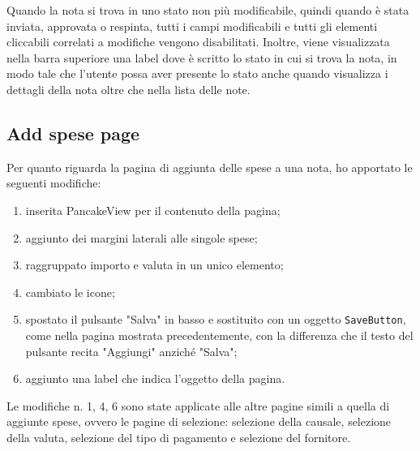 \noindent Quando la nota si trova in uno stato non più modificabile, quindi quando è stata inviata, approvata o respinta, tutti i campi modificabili e tutti gli elementi cliccabili correlati a modifiche vengono disabilitati. Inoltre, viene visualizzata nella barra superiore una label dove è scritto lo stato in cui si trova la nota, in modo tale che l'utente possa aver presente lo stato anche quando visualizza i dettagli della nota oltre che nella lista delle note.

\clearpage

\subsection{Add spese page}

Per quanto riguarda la pagina di aggiunta delle spese a una nota, ho apportato le seguenti modifiche:
\begin{enumerate}
    \item inserita PancakeView per il contenuto della pagina;
    \item aggiunto dei margini laterali alle singole spese;
    \item raggruppato importo e valuta in un unico elemento;
    \item cambiato le icone;
    \item spostato il pulsante "Salva" in basso e sostituito con un oggetto \verb|SaveButton|, come nella pagina mostrata precedentemente, con la differenza che il testo del pulsante recita "Aggiungi" anziché "Salva";
    \item aggiunto una label che indica l'oggetto della pagina.
\end{enumerate}

\noindent Le modifiche n. 1, 4, 6 sono state applicate alle altre pagine simili a quella di aggiunte spese, ovvero le pagine di selezione: selezione della causale, selezione della valuta, selezione del tipo di pagamento e selezione del fornitore.


